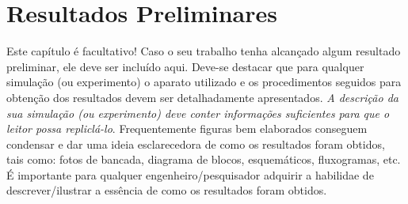 \chapter{Resultados Preliminares}
Este capítulo é facultativo! Caso o seu trabalho tenha alcançado algum resultado preliminar, ele deve ser incluído aqui. Deve-se destacar que para qualquer simulação (ou experimento) o aparato utilizado e os procedimentos seguidos para obtenção dos resultados devem ser detalhadamente apresentados. \emph{A descrição da sua simulação (ou experimento) deve conter informações suficientes para que o leitor possa repliclá-lo}. Frequentemente figuras bem elaborados conseguem condensar e dar uma ideia esclarecedora de como os resultados foram obtidos, tais como: fotos de bancada, diagrama de blocos, esquemáticos, fluxogramas, etc. É importante para qualquer engenheiro/pesquisador adquirir a habilidae de descrever/ilustrar a essência de como os resultados foram obtidos.
